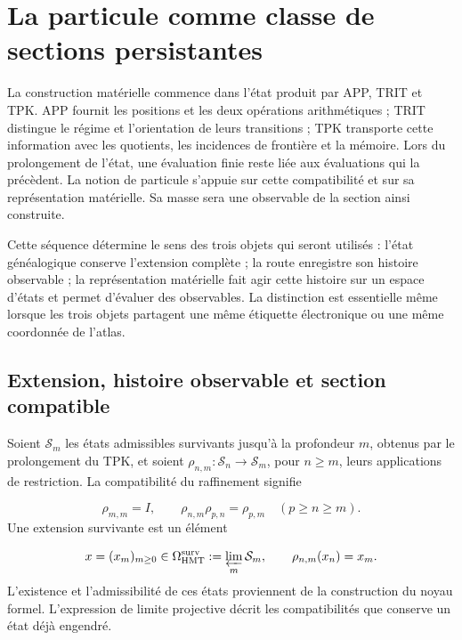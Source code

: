 \section{La particule comme classe de sections persistantes
}
\label{vi:sec:particula}

La construction matérielle commence dans l’état produit par APP, TRIT et
TPK. APP fournit les positions et les deux opérations arithmétiques ;
TRIT distingue le régime et l’orientation de leurs transitions ; TPK
transporte cette information avec les quotients, les incidences de
frontière et la mémoire. Lors du prolongement de l’état, une évaluation finie
reste liée aux évaluations qui la précèdent. La notion de
particule s’appuie sur cette compatibilité et sur sa représentation matérielle.
Sa masse sera une observable de la section ainsi construite.


Cette séquence détermine le sens des trois objets qui seront
utilisés : l’état généalogique conserve l’extension complète ; la route
enregistre son histoire observable ; la représentation matérielle fait agir
cette histoire sur un espace d’états et permet d’évaluer des observables.
La distinction est essentielle même lorsque les trois objets partagent
une même étiquette électronique ou une même coordonnée de l’atlas.


\subsection{Extension, histoire observable et section compatible
}
\label{vi:subsec:extension-persistente}

Soient $\mathcal S_m$ les états admissibles survivants jusqu’à la profondeur
$m$, obtenus par le prolongement du TPK, et soient
$\rho_{n,m}:\mathcal S_n\to\mathcal S_m$, pour $n\geq m$, leurs
applications de restriction. La compatibilité du raffinement signifie

\begin{equation}
 \rho_{m,m}=I,\qquad
 \rho_{n,m}\rho_{p,n}=\rho_{p,m}\quad(p\geq n\geq m).
 \label{vi:eq:sistema-estados}
\end{equation}
Une extension survivante est un élément

\begin{equation}
 x=(x_m)_{m\geq0}\in\Omega^{\mathrm{surv}}_{\mathrm{HMT}}
 :=\varprojlim_m\mathcal S_m,
 \qquad \rho_{n,m}(x_n)=x_m.
 \label{vi:eq:extension-superviviente}
\end{equation}
L’existence et l’admissibilité de ces états proviennent de la
construction du noyau formel. L’expression de limite projective décrit
les compatibilités que conserve un état déjà engendré.


